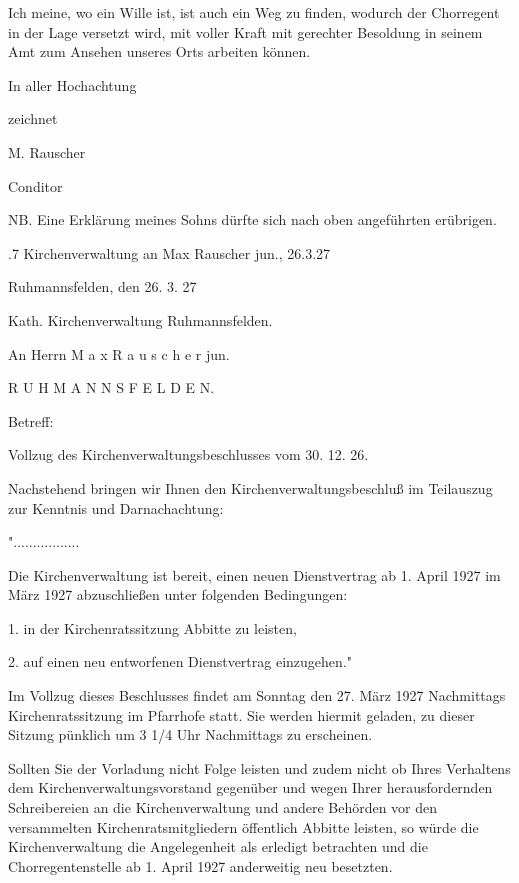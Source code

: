 \documentclass{book}
\begin{document}
Ich meine, wo ein Wille ist, ist auch ein Weg zu finden, wodurch der Chorregent
in der Lage versetzt wird, mit voller Kraft mit gerechter Besoldung in seinem
Amt zum Ansehen unseres Orts arbeiten können.



    In aller Hochachtung

        zeichnet

        M. Rauscher

            Conditor



NB. Eine Erklärung meines Sohns dürfte sich nach oben angeführten erübrigen.

.7 Kirchenverwaltung an Max Rauscher jun., 26.3.27

Ruhmannsfelden, den 26. 3. 27

Kath. Kirchenverwaltung Ruhmannsfelden.



An Herrn   M a x   R a u s c h e r   jun.



R U H M A N N S F E L D E N.



Betreff:



Vollzug des Kirchenverwaltungsbeschlusses vom 30. 12. 26.



Nachstehend bringen wir Ihnen den Kirchenverwaltungsbeschluß im Teilauszug zur
Kenntnis und Darnachachtung:



".................

Die Kirchenverwaltung ist bereit, einen neuen Dienstvertrag ab 1. April 1927 im
März 1927 abzuschließen unter folgenden Bedingungen:

1. in der Kirchenratssitzung Abbitte zu leisten,

2. auf einen neu entworfenen Dienstvertrag einzugehen."

Im Vollzug dieses Beschlusses findet am Sonntag den 27. März 1927 Nachmittags
Kirchenratssitzung im Pfarrhofe statt. Sie werden hiermit geladen, zu dieser
Sitzung pünklich um 3 1/4 Uhr Nachmittags zu erscheinen.

Sollten Sie der Vorladung nicht Folge leisten und zudem nicht ob Ihres
Verhaltens dem Kirchenverwaltungsvorstand gegenüber und wegen Ihrer
herausfordernden Schreibereien an die Kirchenverwaltung und andere Behörden vor
den versammelten Kirchenratsmitgliedern öffentlich Abbitte leisten, so würde die
Kirchenverwaltung die Angelegenheit als erledigt betrachten und die
Chorregentenstelle ab 1. April 1927 anderweitig neu besetzten.
\end{document}
